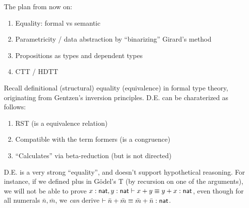 \documentclass{article}
\begin{document}
The plan from now on:
\begin{enumerate}
\item Equality: formal vs semantic
\item Parametricity / data abstraction by ``binarizing'' Girard's method
\item Propositions as types and dependent types
\item CTT / HDTT
\end{enumerate}

Recall definitional (structural) equality (equivalence) in formal type theory, originating from Gentzen's inversion 
principles. D.E. can be charaterized as follows:
\begin{enumerate}
\item RST (is a equivalence relation)
\item Compatible with the term formers (is a congruence)
\item ``Calculates'' via beta-reduction (but is not directed)
\end{enumerate}

D.E. is a very strong ``equality'', and doesn't support hypothetical reasoning. For instance, if we defined plus in 
G{\"o}del's T (by recursion on one of the arguments), 
we will not be able to prove $x : \mathsf{nat}, y : \mathsf{nat} \vdash x + y \equiv y + x : \mathsf{nat}$, even though for all numerals
$\bar n, \bar m$, we \emph{can} derive $ \vdash \bar n + \bar m \equiv \bar m + \bar n : \mathsf{nat}$.


\end{document}
